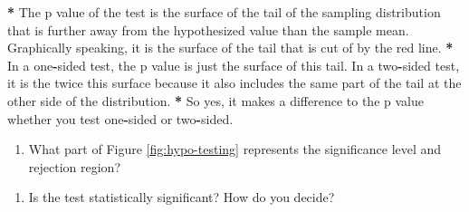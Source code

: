 \documentclass[a4paper]{book}
\newenvironment{Shaded}{\begin{snugshade}}{\end{snugshade}}
\newcommand{\FloatTok}[1]{\textcolor[rgb]{0.00,0.00,0.00}{#1}}
\newcommand{\StringTok}[1]{\textcolor[rgb]{0.00,0.00,0.00}{#1}}
\newcommand{\OperatorTok}[1]{\textcolor[rgb]{0.00,0.00,0.00}{\textbf{#1}}}
\newcommand{\NormalTok}[1]{#1}
\providecommand{\tightlist}{%
  \setlength{\itemsep}{0pt}\setlength{\parskip}{0pt}}
\theoremstyle{definition}
\theoremstyle{definition}
\theoremstyle{definition}
\theoremstyle{remark}
\begin{document}
\begin{Shaded}
\begin{Highlighting}[]
\OperatorTok{*}\StringTok{ }\NormalTok{The p value of the test is the surface of the tail of the sampling}
\NormalTok{distribution that is further away from the hypothesized value than the sample}
\NormalTok{mean. Graphically speaking, it is the surface of the tail that is cut of by}
\NormalTok{the red line.}
\OperatorTok{*}\StringTok{ }\NormalTok{In a one}\OperatorTok{-}\NormalTok{sided test, the p value is just the surface of this tail. In a}
\NormalTok{two}\OperatorTok{-}\NormalTok{sided test, it is the twice this surface because it also includes the same}
\NormalTok{part of the tail at the other side of the distribution.}
\OperatorTok{*}\StringTok{ }\NormalTok{So yes, it makes a difference to the p value whether you test one}\OperatorTok{-}\NormalTok{sided or}
\NormalTok{two}\OperatorTok{-}\NormalTok{sided.}
\end{Highlighting}
\end{Shaded}

\begin{enumerate}
\def\labelenumi{\arabic{enumi}.}
\setcounter{enumi}{2}
\tightlist
\item
  What part of Figure \ref{fig:hypo-testing} represents the significance
  level and rejection region?
\end{enumerate}

\begin{Shaded}
\end{Shaded}

\begin{enumerate}
\def\labelenumi{\arabic{enumi}.}
\setcounter{enumi}{3}
\tightlist
\item
  Is the test statistically significant? How do you decide?
\end{enumerate}
\end{document}

